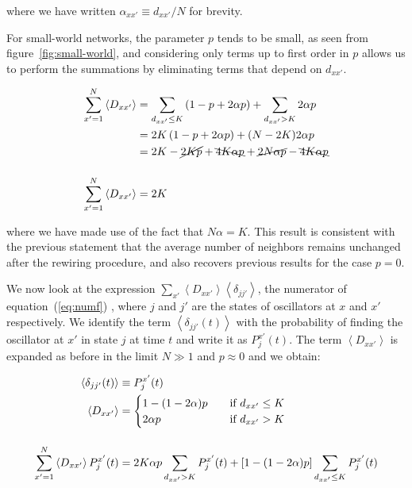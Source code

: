 \noindent where we have written $\alpha_{xx'} \equiv d_{xx'}/N$ for brevity.

For small-world networks, the parameter $p$ tends to be small\cite{rodrigues2020synchronization}, as seen from
figure~\ref{fig:small-world}, and considering only terms up to first order in $p$ allows us to perform the summations by eliminating
terms that depend on $d_{xx'}$.

\begin{align}
    \sum_{x'=1}^N \left< D_{xx'} \right> &= \sum_{d_{xx'}\leq K} \left( 1 - p + 2\alpha p \right) + \sum_{d_{xx'}> K} 2\alpha p \notag\\
    &= 2K\left( 1 - p + 2\alpha p \right) + (N-2K)2\alpha p \notag\\
    &= 2K - \cancel{2Kp} + \bcancel{4K\alpha p} + \cancel{2N\alpha p} - \bcancel{4K\alpha p} \notag\\[12pt]
    \sum_{x'=1}^N \left< D_{xx'} \right> &= 2K
    \label{eq:ppower3}
\end{align}

\noindent where we have made use of the fact that $N\alpha = K$. This result is consistent with the previous statement that the average
number of neighbors remains unchanged after the rewiring procedure, and also recovers previous results\cite{escaff2014arrays} for the
case $p=0$.

We now look at the expression $\sum_{x'} \left< D_{xx'} \right> \left< \delta_{jj'} \right>$, the numerator of equation~(\ref{eq:numf})
, where $j$ and $j'$ are the states of oscillators at $x$ and $x'$ respectively. We identify the term $\left< \delta_{jj'}(t) \right>$
with the probability of finding the oscillator at $x'$ in state $j$ at time $t$ and write it as $P_j^{x'}(t)$. The term $\left< D_{xx'}
\right>$ is expanded as before in the limit $N \gg 1$ and $p \approx 0$ and we obtain:

\begin{align}
    \left< \delta_{jj'}(t) \right> &\equiv P_j^{x'}(t) \notag\\
    \left< D_{xx'} \right> &=
    \begin{cases}
        1-(1-2\alpha)p \quad &\text{if $d_{xx'} \leq K$}\\
        2\alpha p \quad &\text{if $d_{xx'} > K$}\\
    \end{cases} \notag\\[12pt]
    \sum_{x'=1}^N \left< D_{xx'} \right> P_j^{x'}(t) &= 2K\alpha p \sum_{d_{xx'}>K}P_j^{x'}(t) + [1-(1-2\alpha)p]\sum_{d_{xx'}\leq K} P_j^{x'}(t)
    \label{eq:numerator}
\end{align}

